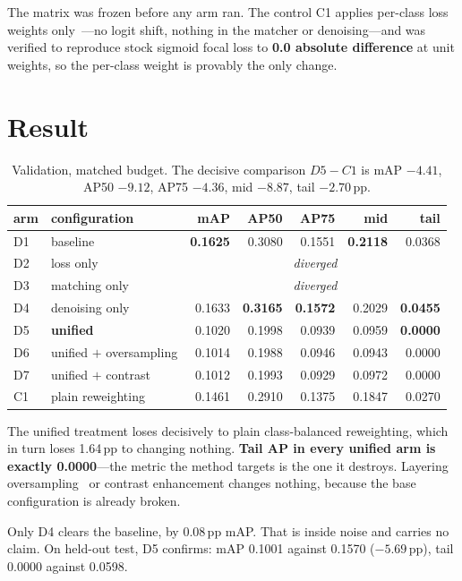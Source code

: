 \documentclass[11pt,letterpaper]{article}
\begin{document}
The matrix was frozen before any arm ran. The control C1 applies per-class loss
weights only~\cite{cui2019classbalanced}---no logit shift, nothing in the
matcher or denoising---and was verified to reproduce stock sigmoid focal loss to
\textbf{0.0 absolute difference} at unit weights, so the per-class weight is
provably the only change.

\section{Result}

\begin{table}[h]
\centering\small
\begin{tabular}{llrrrrr}
\toprule
arm & configuration & mAP & AP50 & AP75 & mid & tail \\
\midrule
D1 & baseline & \textbf{0.1625} & 0.3080 & 0.1551 & \textbf{0.2118} & 0.0368 \\
D2 & loss only & \multicolumn{5}{c}{\emph{diverged}} \\
D3 & matching only & \multicolumn{5}{c}{\emph{diverged}} \\
D4 & denoising only & 0.1633 & \textbf{0.3165} & \textbf{0.1572} & 0.2029 & \textbf{0.0455} \\
D5 & \textbf{unified} & 0.1020 & 0.1998 & 0.0939 & 0.0959 & \textbf{0.0000} \\
D6 & unified $+$ oversampling & 0.1014 & 0.1988 & 0.0946 & 0.0943 & 0.0000 \\
D7 & unified $+$ contrast & 0.1012 & 0.1993 & 0.0929 & 0.0972 & 0.0000 \\
C1 & plain reweighting & 0.1461 & 0.2910 & 0.1375 & 0.1847 & 0.0270 \\
\bottomrule
\end{tabular}
\caption{Validation, matched budget. The decisive comparison $D5-C1$ is
mAP $-4.41$, AP50 $-9.12$, AP75 $-4.36$, mid $-8.87$, tail $-2.70$\,pp.}
\end{table}

The unified treatment loses decisively to plain class-balanced reweighting,
which in turn loses 1.64\,pp to changing nothing. \textbf{Tail AP in every
unified arm is exactly 0.0000}---the metric the method targets is the one it
destroys. Layering oversampling~\cite{gupta2019lvis} or contrast enhancement
changes nothing, because the base configuration is already broken.

Only D4 clears the baseline, by 0.08\,pp mAP. That is inside noise and carries
no claim. On held-out test, D5 confirms: mAP 0.1001 against 0.1570
($-5.69$\,pp), tail 0.0000 against 0.0598.
\end{document}
